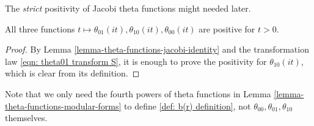 The \emph{strict} positivity of Jacobi theta functions might needed later.
\begin{lemma}\label{lemma-theta-pos}
All three functions $t \mapsto \theta_{01}(it), \theta_{10}(it), \theta_{00}(it)$ are positive for $t > 0$.
\end{lemma}
\begin{proof}
By Lemma \ref{lemma-theta-functions-jacobi-identity} and the transformation law \eqref{eqn: theta01 transform S}, it is enough to prove the positivity for $\theta_{10}(it)$, which is clear from its definition.
\end{proof}

Note that we only need the fourth powers of theta functions in Lemma \ref{lemma-theta-functions-modular-forms} to define \eqref{def: b(r) definition}, not $\theta_{00}, \theta_{01}, \theta_{10}$ themselves.

